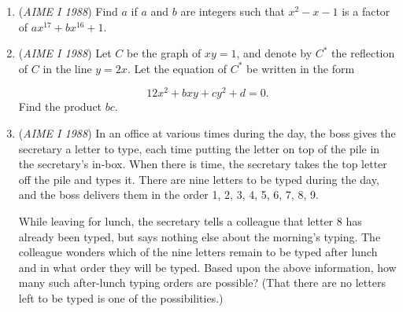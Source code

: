 \begin{enumerate}
	\item (\textit{AIME I 1988}) Find $a$ if $a$ and $b$ are integers such that $x^2 - x - 1$ is a factor of $ax^{17} + bx^{16} + 1$.


 

	\item (\textit{AIME I 1988}) Let $C$ be the graph of $xy = 1$, and denote by $C^*$ the reflection of $C$ in the line $y = 2x$. Let the equation of $C^*$ be written in the form

 \[12x^2 + bxy + cy^2 + d = 0.\]
Find the product $bc$.


 

	\item (\textit{AIME I 1988}) In an office at various times during the day, the boss gives the secretary a letter to type, each time putting the letter on top of the pile in the secretary's in-box. When there is time, the secretary takes the top letter off the pile and types it. There are nine letters to be typed during the day, and the boss delivers them in the order 1, 2, 3, 4, 5, 6, 7, 8, 9.


 While leaving for lunch, the secretary tells a colleague that letter 8 has already been typed, but says nothing else about the morning's typing. The colleague wonders which of the nine letters remain to be typed after lunch and in what order they will be typed. Based upon the above information, how many such after-lunch typing orders are possible? (That there are no letters left to be typed is one of the possibilities.)


 

\end{enumerate}